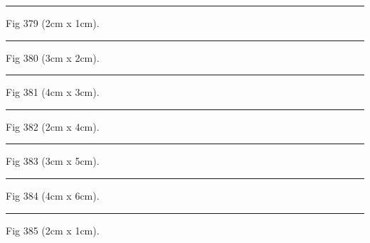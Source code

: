\documentclass[a4paper,11pt]{article}
\begin{document}
\begin{swarmwrap}%
  \begin{minipage}[t]{2cm}
    \centering
    \rule{\linewidth}{1cm}
    {\footnotesize Fig 379 (2cm x 1cm).}
  \end{minipage}%
\end{swarmwrap}%
\swarmwrapnext
\lipsum[79]%

\begin{swarmwrap}%
  \begin{minipage}[t]{3cm}
    \centering
    \rule{\linewidth}{2cm}
    {\footnotesize Fig 380 (3cm x 2cm).}
  \end{minipage}%
\end{swarmwrap}%
\swarmwrapnext
\lipsum[80]%

\begin{swarmwrap}%
  \begin{minipage}[t]{4cm}
    \centering
    \rule{\linewidth}{3cm}
    {\footnotesize Fig 381 (4cm x 3cm).}
  \end{minipage}%
\end{swarmwrap}%
\swarmwrapnext
\lipsum[81]%

\begin{swarmwrap}%
  \begin{minipage}[t]{2cm}
    \centering
    \rule{\linewidth}{4cm}
    {\footnotesize Fig 382 (2cm x 4cm).}
  \end{minipage}%
\end{swarmwrap}%
\swarmwrapnext
\lipsum[82]%

\begin{swarmwrap}%
  \begin{minipage}[t]{3cm}
    \centering
    \rule{\linewidth}{5cm}
    {\footnotesize Fig 383 (3cm x 5cm).}
  \end{minipage}%
\end{swarmwrap}%
\swarmwrapnext
\lipsum[83]%

\begin{swarmwrap}%
  \begin{minipage}[t]{4cm}
    \centering
    \rule{\linewidth}{6cm}
    {\footnotesize Fig 384 (4cm x 6cm).}
  \end{minipage}%
\end{swarmwrap}%
\swarmwrapnext
\lipsum[84]%

\begin{swarmwrap}%
  \begin{minipage}[t]{2cm}
    \centering
    \rule{\linewidth}{1cm}
    {\footnotesize Fig 385 (2cm x 1cm).}
  \end{minipage}%
\end{swarmwrap}%
\swarmwrapnext
\lipsum[85]%
\end{document}
